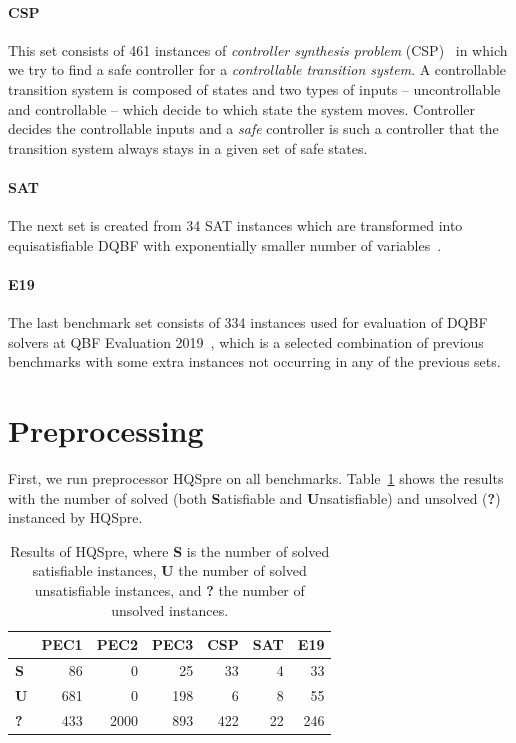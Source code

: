 \documentclass[
  digital, %
  color,
  twoside, %
  table,   %
  nolof,     %
  nolot,     %
]{fithesis3}
\theoremstyle{definition}
\theoremstyle{remark}
\begin{document}
\paragraph{CSP}
This set consists of 461 instances of \emph{controller synthesis problem} (CSP)~\cite{CSPbenchmarks} in which we try to find a safe controller for a \emph{controllable transition system}. A controllable transition system is composed of states and two types of inputs -- uncontrollable and controllable -- which decide to which state the system moves. Controller decides the controllable inputs and a \emph{safe} controller is such a controller that the transition system always stays in a given set of safe states.

\paragraph{SAT}
The next set is created from 34 SAT instances which are transformed into equisatisfiable DQBF with exponentially smaller number of variables~\cite{SATbenchmarks}.

\paragraph{E19}
The last benchmark set consists of 334 instances used for evaluation of DQBF solvers at QBF Evaluation 2019~\cite{QBFeval19}, which is a selected combination of previous benchmarks with some extra instances not occurring in any of the previous sets.


\section{Preprocessing}
First, we run preprocessor HQSpre on all benchmarks. Table~\ref{tab:HQSpre} shows the results with the number of solved (both \textbf{S}atisfiable and \textbf{U}n\-sa\-ti\-sfi\-able) and unsolved (\textbf{?}) instanced by HQSpre.

\begin{table}[ht]
\centering
\caption{Results of HQSpre, where \textbf{S} is the number of solved satisfiable instances, \textbf{U} the number of solved unsatisfiable instances, and \textbf{?} the number of unsolved instances.}
\label{tab:HQSpre}
\begin{tabular}{c|r|r|r|r|r|r|}
\hhline{~*{6}{-}}
\cellcolor{white}                %
& \multicolumn{1}{c|}{\textbf{PEC1}} & \multicolumn{1}{c|}{\textbf{PEC2}} & \multicolumn{1}{c|}{\textbf{PEC3}} & \multicolumn{1}{c|}{\textbf{CSP}} & \multicolumn{1}{c|}{\textbf{SAT}} & \multicolumn{1}{c|}{\textbf{E19}} \\ \hline
\multicolumn{1}{|l|}{\textbf{S}} %
& \phantom{000}86 & \phantom{0000}0 & \phantom{000}25 & \phantom{000}33 & \phantom{0000}4 & \phantom{000}33 \\ \hline
\multicolumn{1}{|l|}{\textbf{U}} %
& 681 & 0 & 198 & 6 & 8 & 55 \\ \hline
\multicolumn{1}{|l|}{\textbf{?}} %
& 433 & \num{2000} & 893 & 422 & 22 & 246 \\ \hline
\end{tabular}
\end{table}
\end{document}
